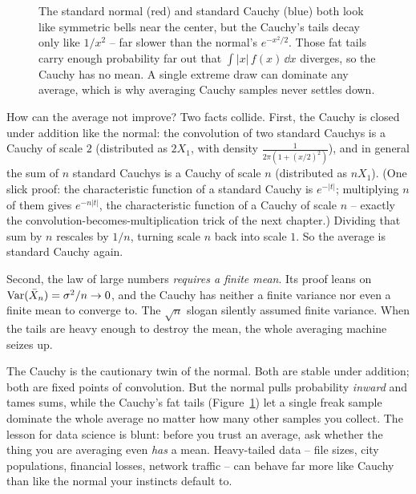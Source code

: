 \begin{figure}[H]
\centering
{}
\caption{The standard normal (red) and standard Cauchy (blue) both look like
symmetric bells near the center, but the Cauchy's tails decay only like
$1/x^2$ -- far slower than the normal's $e^{-x^2/2}$. Those fat tails carry
enough probability far out that $\int|x|\,f(x)\,\dd x$ diverges, so the Cauchy
has no mean. A single extreme draw can dominate any average, which is why
averaging Cauchy samples never settles down.}
\label{ch17:fig-cauchy}
\end{figure}

\begin{whybox}
How can the average not improve? Two facts collide. First, the Cauchy is
closed under addition like the normal: the convolution of two standard
Cauchys is a Cauchy of scale $2$ (distributed as $2X_1$, with density
$\frac{1}{2\pi(1+(x/2)^2)}$), and in general the sum of $n$ standard
Cauchys is a Cauchy of scale $n$ (distributed as $nX_1$). (One slick proof: the characteristic
function of a standard Cauchy is $e^{-|t|}$; multiplying $n$ of them gives
$e^{-n|t|}$, the characteristic function of a Cauchy of scale $n$ --
exactly the convolution-becomes-multiplication trick of the next chapter.)
Dividing that sum by $n$ rescales by $1/n$, turning scale $n$ back into
scale $1$. So the average is standard Cauchy again.

Second, the law of large numbers \emph{requires a finite mean}. Its proof
leans on $\operatorname{Var}(\bar X_n)=\sigma^2/n\to 0$, and the Cauchy has neither a
finite variance nor even a finite mean to converge to. The $\sqrt n$
slogan silently assumed finite variance. When the tails are heavy enough
to destroy the mean, the whole averaging machine seizes up.
\end{whybox}

\begin{aestheticbox}
The Cauchy is the cautionary twin of the normal. Both are stable under
addition; both are fixed points of convolution. But the normal pulls
probability \emph{inward} and tames sums, while the Cauchy's fat tails (Figure~\ref{ch17:fig-cauchy}) let
a single freak sample dominate the whole average no matter how many other
samples you collect. The lesson for data science is blunt: before you
trust an average, ask whether the thing you are averaging even \emph{has}
a mean. Heavy-tailed data -- file sizes, city populations, financial
losses, network traffic -- can behave far more like Cauchy than like the
normal your instincts default to.
\end{aestheticbox}

